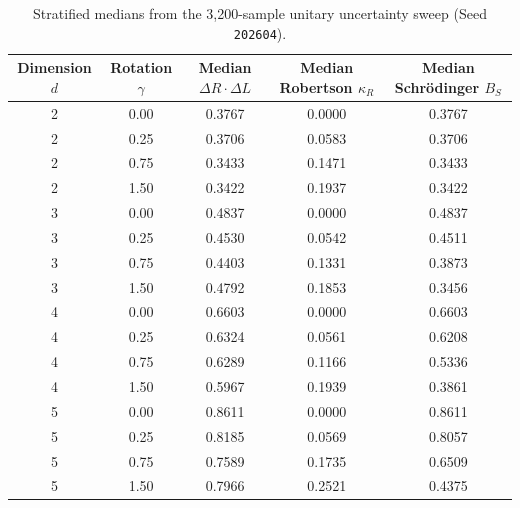 \begin{table}[htbp]
\centering
\small
\caption{Stratified medians from the 3,200-sample unitary uncertainty sweep (Seed \texttt{202604}).}
\label{tab:uncertainty-cells}
\begin{tabular}{@{}ccccc@{}}
\toprule
Dimension $d$ & Rotation $\gamma$ & Median $\Delta R \cdot \Delta L$ & Median Robertson $\kappa_R$ & Median Schr\"odinger $B_S$ \\
\midrule
2 & 0.00 & 0.3767 & 0.0000 & 0.3767 \\
2 & 0.25 & 0.3706 & 0.0583 & 0.3706 \\
2 & 0.75 & 0.3433 & 0.1471 & 0.3433 \\
2 & 1.50 & 0.3422 & 0.1937 & 0.3422 \\
3 & 0.00 & 0.4837 & 0.0000 & 0.4837 \\
3 & 0.25 & 0.4530 & 0.0542 & 0.4511 \\
3 & 0.75 & 0.4403 & 0.1331 & 0.3873 \\
3 & 1.50 & 0.4792 & 0.1853 & 0.3456 \\
4 & 0.00 & 0.6603 & 0.0000 & 0.6603 \\
4 & 0.25 & 0.6324 & 0.0561 & 0.6208 \\
4 & 0.75 & 0.6289 & 0.1166 & 0.5336 \\
4 & 1.50 & 0.5967 & 0.1939 & 0.3861 \\
5 & 0.00 & 0.8611 & 0.0000 & 0.8611 \\
5 & 0.25 & 0.8185 & 0.0569 & 0.8057 \\
5 & 0.75 & 0.7589 & 0.1735 & 0.6509 \\
5 & 1.50 & 0.7966 & 0.2521 & 0.4375 \\
\bottomrule
\end{tabular}
\end{table}
